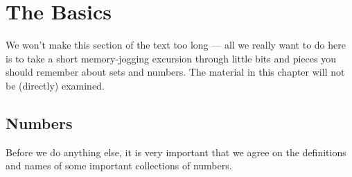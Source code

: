 %
%
\graphicspath{{./figures/basic/}}

\chapter{The Basics}
\label{chap basics}
We won't make this section of the text too long --- all we really want to do
here is to take a short memory-jogging excursion through little bits and
pieces you should remember about sets and numbers. The material in this chapter will not
be (directly) examined.


\section{Numbers}
Before we do anything else, it is very important that we agree on the definitions
and names of some important collections of numbers.

